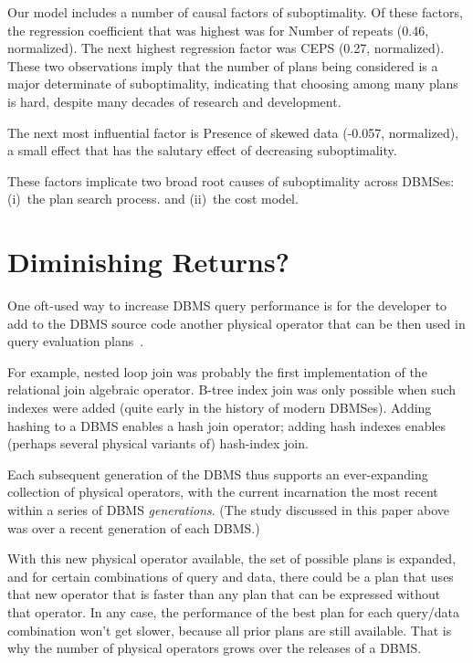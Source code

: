 \documentclass[prodmode,acmtods]{acmsmall}
\begin{document}
Our model includes a number of causal factors of suboptimality. Of these
factors, the regression \hbox{coefficient} that was highest was for Number
of repeats (0.46, normalized). The next \hbox{highest}
regression factor was CEPS (0.27, normalized). These two observations imply that the
number of plans being considered is a major determinate of
suboptimality, indicating that choosing among many plans is hard, despite
many decades of research and development.

The next most influential factor is  Presence of skewed
data (-0.057, normalized), a small effect that has the salutary effect of
decreasing suboptimality.

These factors implicate two broad root causes of suboptimality across \hbox{DBMSes}:
(i)~the plan search process. and (ii)~the cost model.

\section{Diminishing Returns?}\label{sec:diminishing}
One oft-used way to increase DBMS query performance is for the developer to
add to the DBMS source code another physical operator that can be then used
in query evaluation plans~\cite{Graefe93}.

For example, nested loop join was probably the
first implementation of the relational join algebraic operator. B-tree index join
was only possible when such indexes were added (quite early in the history
of modern DBMSes). Adding hashing to a DBMS enables a hash join operator;
adding hash indexes enables (perhaps several physical variants of)
hash-index join.

Each
subsequent generation of the \hbox{DBMS} thus supports an ever-expanding
collection of physical operators, with the current incarnation the most recent
within a series of \hbox{DBMS} {\em generations}. (The study discussed in
this paper above was over a recent generation of each DBMS.)

With this new physical operator
available, the set of possible plans is expanded, and for certain
combinations of query and data, there could be a plan that uses that new
operator that is faster than any plan that can be expressed without that
operator. In any case, the performance of the best plan for each query/data
combination won't get slower, because all prior plans are still
available. That is why the number of physical operators grows over the
releases of a DBMS.
\end{document}
